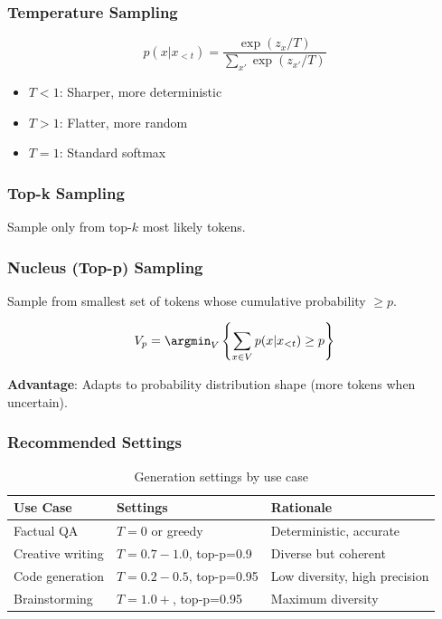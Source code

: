 \subsubsection{Temperature Sampling}
\begin{equation}
p(x | x_{<t}) = \frac{\exp(z_x / T)}{\sum_{x'} \exp(z_{x'} / T)}
\end{equation}

\begin{itemize}
    \item $T < 1$: Sharper, more deterministic
    \item $T > 1$: Flatter, more random
    \item $T = 1$: Standard softmax
\end{itemize}

\subsubsection{Top-k Sampling}
Sample only from top-$k$ most likely tokens.

\subsubsection{Nucleus (Top-p) Sampling}
Sample from smallest set of tokens whose cumulative probability $\geq p$.

\begin{equation}
V_p = \argmin_V \left\{\sum_{x \in V} p(x | x_{<t}) \geq p\right\}
\end{equation}

\textbf{Advantage}: Adapts to probability distribution shape (more tokens when uncertain).

\subsubsection{Recommended Settings}

\begin{table}[H]
\centering
\caption{Generation settings by use case}
\begin{tabularx}{\textwidth}{lXX}
\toprule
\textbf{Use Case} & \textbf{Settings} & \textbf{Rationale} \\
\midrule
Factual QA & $T=0$ or greedy & Deterministic, accurate \\
Creative writing & $T=0.7-1.0$, top-p=0.9 & Diverse but coherent \\
Code generation & $T=0.2-0.5$, top-p=0.95 & Low diversity, high precision \\
Brainstorming & $T=1.0+$, top-p=0.95 & Maximum diversity \\
\bottomrule
\end{tabularx}
\end{table}

